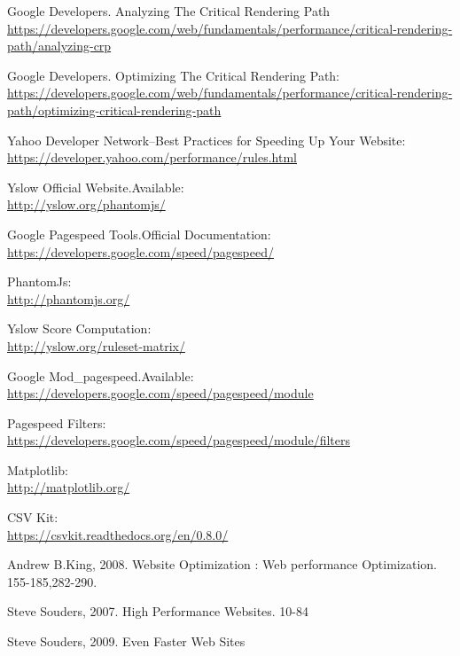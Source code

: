 \documentclass[conference]{IEEEtran}
\begin{document}
\begin{thebibliography}{1}
Google Developers. Analyzing The Critical Rendering Path\\
\href{
https://developers.google.com/web/fundamentals/performance/critical-rendering-path/analyzing-crp}
{https://developers.google.com/web/fundamentals/performance/critical-rendering-path/analyzing-crp}

Google Developers. Optimizing The Critical Rendering Path:\\
\href{
https://developers.google.com/web/fundamentals/performance/critical-rendering-path/optimizing-critical-rendering-path}
{https://developers.google.com/web/fundamentals/performance/critical-rendering-path/optimizing-critical-rendering-path}

Yahoo Developer Network--Best Practices for Speeding Up Your Website:\\
\href{https://developer.yahoo.com/performance/rules.html}{
https://developer.yahoo.com/performance/rules.html}

Yslow Official Website.Available:\\
\href{http://yslow.org/phantomjs/}{http://yslow.org/phantomjs/
}

Google Pagespeed Tools.Official Documentation:\\
\href{https://developers.google.com/speed/pagespeed/}{
https://developers.google.com/speed/pagespeed/}

PhantomJs:\\
\href{http://phantomjs.org/}
{http://phantomjs.org/}

Yslow Score Computation:\\
\href{http://yslow.org/ruleset-matrix/}
{http://yslow.org/ruleset-matrix/}

Google Mod\_pagespeed.Available:\\
\href{
https://developers.google.com/speed/pagespeed/module}{
https://developers.google.com/speed/pagespeed/module}
 
Pagespeed Filters:\\
\href{https://developers.google.com/speed/pagespeed/module/filters}
{https://developers.google.com/speed/pagespeed/module/filters}

Matplotlib:\\
\href{http://matplotlib.org/}
{http://matplotlib.org/}

CSV Kit:\\
\href{https://csvkit.readthedocs.org/en/0.8.0/}
{https://csvkit.readthedocs.org/en/0.8.0/}

Andrew B.King, 2008. Website Optimization : Web performance
Optimization. 155-185,282-290.

Steve Souders, 2007.  High Performance Websites. 10-84

Steve Souders, 2009. Even Faster Web Sites

\end{thebibliography}
\end{document}
